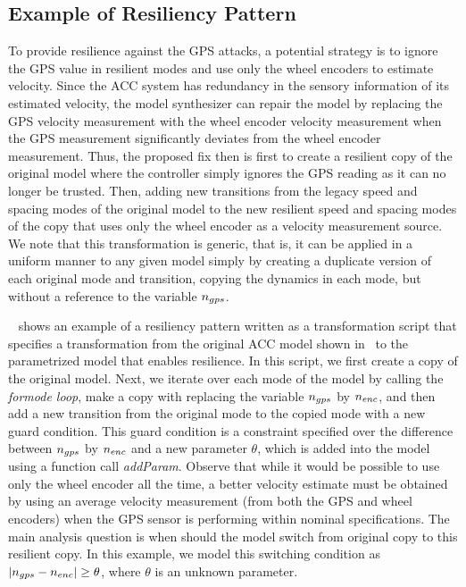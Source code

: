 \subsection{Example of Resiliency Pattern}
%
%
To provide resilience against the GPS attacks, a potential strategy is to ignore the GPS value in resilient modes and use only the wheel encoders to estimate velocity. Since the ACC system has redundancy in the sensory information of its estimated velocity, the model synthesizer can repair the model by replacing the GPS velocity measurement with the wheel encoder velocity measurement when the GPS measurement significantly deviates from the wheel encoder measurement.
%
%
Thus, the proposed fix then is first to create a resilient copy of the original model where the controller simply ignores the GPS reading as it can no longer be trusted. Then, adding new transitions from the legacy speed and spacing modes of the original model to the new resilient speed and spacing modes of the copy that uses only the wheel encoder as a velocity measurement source. We note that this transformation is generic, that is, it can be applied in a uniform manner to any given model simply by creating a duplicate version of each original mode and transition, copying the dynamics in each mode, but without a reference to the variable $n_{gps}$.

%
%
%
%


~ shows an example of a resiliency pattern written as a transformation script that specifies a transformation from the original ACC model shown in~ to the parametrized model that enables resilience.
%
In this script, we first create a copy of the original model. Next, we iterate over each mode of the model by calling the \emph{formode loop}, make a copy with replacing the variable $n_{gps}$ by $n_{enc}$, and then add a new transition from the original mode to the copied mode with a new guard condition. This guard condition is a constraint specified over the difference between $n_{gps}$ by $n_{enc}$ and a new parameter $\theta$, which is added into the model using a function call \emph{addParam}.
%
%
Observe that while it would be possible to use only the wheel encoder all the time, a better velocity estimate must be obtained by using an average velocity measurement (from both the GPS and wheel encoders) when the GPS sensor is performing within nominal specifications. The main analysis question is when should the model switch from original copy to this resilient copy.  In this example, we model this switching condition as $|n_{gps} -n_{enc}| \geq \theta$, where $\theta$ is an unknown parameter.



